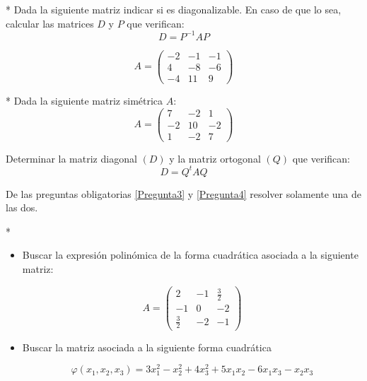 \begin{Quest}*\label{Pregunta3}
Dada la siguiente matriz indicar si es diagonalizable.  En caso de que lo sea, calcular las matrices $D$ y $P$ que verifican:
\[
D = P^{-1} A P
\]

\[
A=
\begin{pmatrix}
-2 & -1 & -1\\
4 & -8 & -6\\
-4 & 11 & 9
\end{pmatrix}
\]
\end{Quest}

\begin{Quest}*\label{Pregunta4}
Dada la siguiente matriz simétrica $A$:
\[
A=
\begin{pmatrix}
7 & -2 & 1\\
-2 & 10 & -2\\
1 & -2 & 7
\end{pmatrix}
\]

Determinar la matriz diagonal $(D)$ y la matriz ortogonal $(Q)$ que verifican:
\[
D = Q^t A Q
\]
\end{Quest}
\begin{Note}\label{Nota3}
De las preguntas obligatorias \ref{Pregunta3} y \ref{Pregunta4} resolver solamente una de las dos.
\end{Note}

\begin{Quest}*
\begin{itemize}
\item[a) ]Buscar la expresión polinómica de la forma cuadrática asociada a la siguiente matriz:

\[
A=
\begin{pmatrix}
2 & -1 & \frac{3}{2}\\
-1 & 0 & -2\\
\frac{3}{2} & -2 & -1
\end{pmatrix}
\]

\item[b) ]Buscar la matriz asociada a la siguiente forma cuadrática

\[
\varphi(x_1,x_2,x_3)
= 3x_1^2 - x_2^2 + 4x_3^2 + 5x_1x_2 - 6x_1x_3 - x_2x_3
\]
\end{itemize}
\end{Quest}


